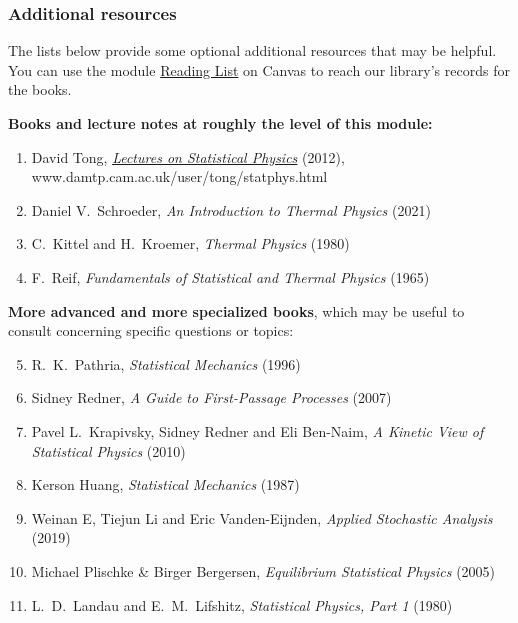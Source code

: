 \subsubsection*{Additional resources}
The lists below provide some optional additional resources that may be helpful.
You can use the module \href{https://liverpool.instructure.com/courses/47333/external_tools/102}{Reading List} on Canvas to reach our library's records for the books.

\noindent\textbf{Books and lecture notes at roughly the level of this module:} \\[-24 pt]
\begin{enumerate}
  \item David Tong, \href{https://www.damtp.cam.ac.uk/user/tong/statphys.html}{\textit{Lectures on Statistical Physics}} (2012), \\ www.damtp.cam.ac.uk/user/tong/statphys.html
  \item Daniel V.~Schroeder, \textit{An Introduction to Thermal Physics} (2021)
  \item C.~Kittel and H.~Kroemer, \textit{Thermal Physics} (1980)
  \item F.~Reif, \textit{Fundamentals of Statistical and Thermal Physics} (1965)
\end{enumerate}

\newpage %
\noindent\textbf{More advanced and more specialized books}, which may be useful to consult concerning specific questions or topics: \\[-24 pt]
\begin{enumerate}
  \setcounter{enumi}{4}
  \item R.~K.~Pathria, \textit{Statistical Mechanics} (1996)
  \item Sidney Redner, \textit{A Guide to First-Passage Processes} (2007)
  \item Pavel L.~Krapivsky, Sidney Redner and Eli Ben-Naim, \textit{A Kinetic View of Statistical Physics} (2010)
  \item Kerson Huang, \textit{Statistical Mechanics} (1987)
  \item Weinan E, Tiejun Li and Eric Vanden-Eijnden, \textit{Applied Stochastic Analysis} (2019)
  \item Michael Plischke \& Birger Bergersen, \textit{Equilibrium Statistical Physics} (2005)
  \item L.~D.~Landau and E.~M.~Lifshitz, \textit{Statistical Physics, Part 1} (1980)
\end{enumerate}

